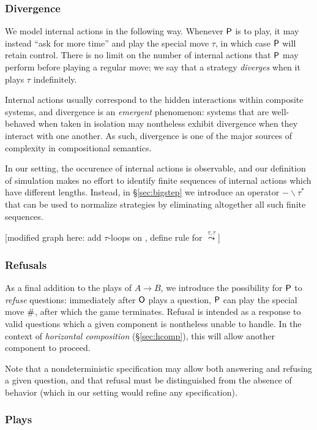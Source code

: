 \subsubsection{Divergence}

We model internal actions in the following way.
Whenever $ \mathsf{P} $ is to play,
it may instead ``ask for more time''
and play the special move $\tau$,
in which case $ \mathsf{P} $ will retain control.
There is no limit on the number of internal actions that
$ \mathsf{P} $ may perform before playing a regular move;
we say that a strategy \emph{diverges}
when it plays $\tau$ indefinitely.

Internal actions usually correspond to the hidden interactions
within composite systems, and
divergence is an \emph{emergent} phenomenon:
systems that are well-behaved when taken in isolation
may nontheless exhibit divergence when they interact with one another.
As such,
divergence is one of the major sources of complexity
in compositional semantics.

In our setting,
the occurence of internal actions
is observable,
and our definition of simulation
makes no effort
to identify finite sequences of internal actions
which have different lengths.
Instead,
in \S\ref{sec:bigstep}
we introduce an operator $- \backslash \tau^*$
that can be used to normalize strategies
by eliminating altogether all such finite sequences.

[modified graph here: add $\tau$-loops on ,
define rule for $\stackrel{\tau,\tau}{\leadsto}$]

\subsubsection{Refusals}

As a final addition to the plays of $A \rightarrow B$,
we introduce the possibility for $ \mathsf{P} $ to \emph{refuse} questions:
immediately after $ \mathsf{O} $ plays a question,
$ \mathsf{P} $ can play the special move $ \mathsf{\#} $,
after which the game terminates.
Refusal is intended as a response to valid questions
which a given component is nontheless unable to handle.
In the context of
\emph{horizontal composition} (\S\ref{sec:hcomp}),
this will allow another component to proceed.

Note that a nondeterministic specification
may allow both answering and refusing a given question,
and that refusal must be distinguished from
the absence of behavior
(which in our setting would refine any specification).

\subsubsection{Plays}

